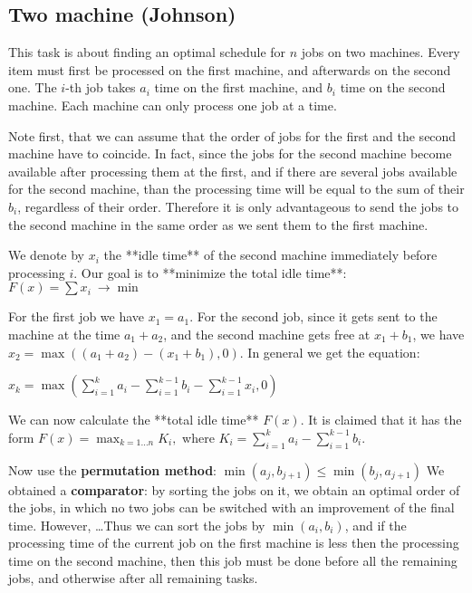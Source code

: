     \subsection{Two machine (Johnson)}

        This task is about finding an optimal schedule for $n$ jobs on two machines.
        Every item must first be processed on the first machine, and afterwards on the second one.
        The $i$-th job takes $a_i$ time on the first machine, and $b_i$ time on the second machine.
        Each machine can only process one job at a time.
    
        Note first, that we can assume that the order of jobs for the first and the second machine have to coincide.
        In fact, since the jobs for the second machine become available after processing them at the first, and if there are several jobs available for the second machine, than the processing time will be equal to the sum of their $b_i$, regardless of their order.
        Therefore it is only advantageous to send the jobs to the second machine in the same order as we sent them to the first machine.
    
        We denote by $x_i$ the **idle time** of the second machine immediately before processing $i$.
        Our goal is to **minimize the total idle time**: $F(x) = \sum x_i ~ \rightarrow \min$

        For the first job we have $x_1 = a_1$.
        For the second job, since it gets sent to the machine at the time $a_1 + a_2$, and the second machine gets free at $x_1 + b_1$, we have $x_2 = \max\left((a_1 + a_2) - (x_1 + b_1), 0\right)$.
        In general we get the equation:
    
        $x_k = \max\left(\sum_{i=1}^k a_i - \sum_{i=1}^{k-1} b_i - \sum_{i=1}^{k-1} x_i, 0 \right)$
    
        We can now calculate the **total idle time** $F(x)$.
        It is claimed that it has the form
            $F(x) = \max_{k=1 \dots n} K_i,$
        where
        $K_i = \sum_{i=1}^k a_i - \sum_{i=1}^{k-1} b_i.$
    
        Now use the \textbf{permutation method}: $\min(a_j, b_{j+1}) \le \min(b_j, a_{j+1})$
        We obtained a \textbf{comparator}:
        by sorting the jobs on it, we obtain an optimal order of the jobs, in which no two jobs can be switched with an improvement of the final time.
        However, \dots Thus we can sort the jobs by $\min(a_i, b_i)$, and if the processing time of the current job on the first machine is less then the processing time on the second machine, then this job must be done before all the remaining jobs, and otherwise after all remaining tasks.


